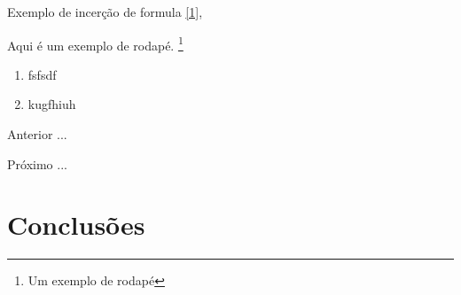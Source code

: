 \par Exemplo de incerção de formula \eqref{1},


Aqui é um exemplo de rodapé. \footnote{Um exemplo de rodapé}


\begin{enumerate}[label=\Roman{*}, ref=(\roman{*})]
  \item fsfsdf
  \item kugfhiuh
\end{enumerate}

\begin{asparaenum}
\item Anterior ... \cite{ninguem2022curioso}
\item Próximo ... \label{pl1}
\end{asparaenum}


\section{Conclusões}




